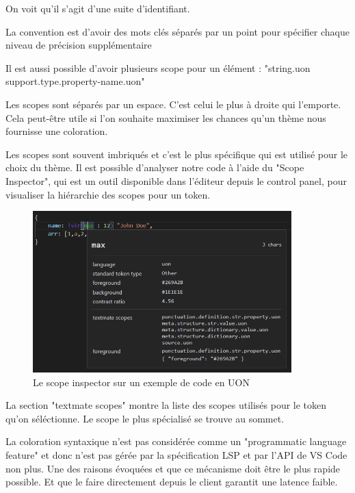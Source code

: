\documentclass[
    iict, %
    il, %
]{heig-tb}
\begin{document}
On voit qu'il s'agit d'une suite d'identifiant.

La convention est d'avoir des mots clés séparés par un point pour spécifier chaque niveau de précision supplémentaire

Il est aussi possible d'avoir plusieurs scope pour un élément : "string.uon support.type.property-name.uon"

Les scopes sont séparés par un espace.
C'est celui le plus à droite qui l'emporte. Cela peut-être utile si l'on souhaite maximiser les chances qu'un thème nous fournisse une coloration.


Les scopes sont souvent imbriqués et c'est le plus spécifique qui est utilisé pour le choix du thème.
Il est possible d'analyser notre code à l'aide du "Scope Inspector", qui est un outil disponible dans l'éditeur depuis le control panel,
pour visualiser la hiérarchie des scopes pour un token.

\begin{figure}[!h]
    \begin{center}
        \includegraphics[width=10cm]{assets/figures/scope-inspector.png}
    \end{center}
    \caption[Scope inspector]{\label{basic-uon} Le scope inspector sur un exemple de code en UON}
\end{figure}

La section "textmate scopes" montre la liste des scopes utilisés pour le token qu'on séléctionne. Le scope le plus spécialisé se trouve au sommet.

La coloration syntaxique n'est pas considérée comme un "programmatic language feature" et donc n'est pas gérée par la spécification LSP et par l'API de VS Code non plus.
Une des raisons évoquées et que ce mécanisme doit être le plus rapide possible. Et que le faire directement depuis le client garantit une latence faible.
\end{document}
